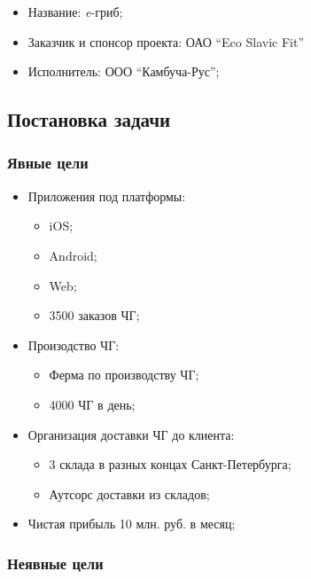 \documentclass[a4paper,10pt]{article}
\begin{document}
    \begin{itemize}
        \item Название: \textit{e}-гриб;
        \item Заказчик и спонсор проекта: ОАО ``Eco Slavic Fit''
        \item Исполнитель: ООО ``Камбуча-Рус'';
    \end{itemize}

\subsection{Постановка задачи}


\subsubsection{Явные цели}

    \begin{itemize}
        \item Приложения под платформы:
            \begin{itemize}
                \item iOS;
                \item Android;
                \item Web;
                \item 3500 заказов ЧГ;
            \end{itemize}
        \item Произодство ЧГ:
            \begin{itemize}
                \item Ферма по производству ЧГ;
                \item 4000 ЧГ в день;
            \end{itemize}
        \item Организация доставки ЧГ до клиента:
            \begin{itemize}
                \item 3 склада в разных концах Санкт-Петербурга;
                \item Аутсорс доставки из складов;
            \end{itemize}
        \item Чистая прибыль 10 млн. руб. в месяц;
    \end{itemize}


\subsubsection{Неявные цели}
\end{document}
